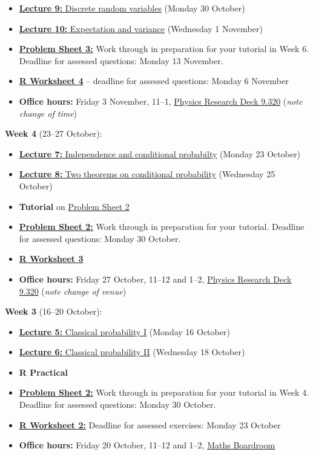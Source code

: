 \documentclass[
  a4paper,
]{book}
\providecommand{\tightlist}{%
  \setlength{\itemsep}{0pt}\setlength{\parskip}{0pt}}
\theoremstyle{definition}
\theoremstyle{definition}
\theoremstyle{definition}
\theoremstyle{definition}
\theoremstyle{remark}
\begin{document}
\begin{itemize}
\tightlist
\item
  \protect\hyperlink{L09-discrete-rv}{\textbf{Lecture 9:} Discrete random variables} (Monday 30 October)
\item
  \protect\hyperlink{L10-expectation}{\textbf{Lecture 10:} Expectation and variance} (Wednesday 1 November)
\item
  \protect\hyperlink{P3}{\textbf{Problem Sheet 3:}} Work through in preparation for your tutorial in Week 6. Deadline for assessed questions: Monday 13 November.
\item
  \protect\hyperlink{R}{\textbf{R Worksheet 4}} -- deadline for assessed questions: Monday 6 November
\item
  \textbf{Office hours:} Friday 3 November, 11--1, \href{https://mpaldridge.github.io/office.html}{Physics Research Deck 9.320} (\emph{note change of time})
\end{itemize}

\textbf{Week 4} (23--27 October):

\begin{itemize}
\tightlist
\item
  \protect\hyperlink{L07-conditional}{\textbf{Lecture 7:} Independence and conditional probabilty} (Monday 23 October)
\item
  \protect\hyperlink{L08-two-theorems}{\textbf{Lecture 8:} Two theorems on conditional probability} (Wednesday 25 October)
\item
  \textbf{Tutorial} on \protect\hyperlink{P2}{Problem Sheet 2}
\item
  \protect\hyperlink{P2}{\textbf{Problem Sheet 2:}} Work through in preparation for your tutorial. Deadline for assessed questions: Monday 30 October.
\item
  \protect\hyperlink{R}{\textbf{R Worksheet 3}}
\item
  \textbf{Office hours:} Friday 27 October, 11--12 and 1--2, \href{https://mpaldridge.github.io/office.html}{Physics Research Deck 9.320} (\emph{note change of venue})
\end{itemize}

\textbf{Week 3} (16--20 October):

\begin{itemize}
\tightlist
\item
  \protect\hyperlink{L05-classical-i}{\textbf{Lecture 5:} Classical probability I} (Monday 16 October)
\item
  \protect\hyperlink{L06-classical-ii}{\textbf{Lecture 6:} Classical probability II} (Wednesday 18 October)
\item
  \textbf{R Practical}
\item
  \protect\hyperlink{P2}{\textbf{Problem Sheet 2:}} Work through in preparation for your tutorial in Week 4. Deadline for assessed questions: Monday 30 October.
\item
  \protect\hyperlink{R}{\textbf{R Worksheet 2:}} Deadline for assessed exercises: Monday 23 October
\item
  \textbf{Office hours:} Friday 20 October, 11--12 and 1--2, \href{boardroom.png}{Maths Boardroom}
\end{itemize}
\end{document}
